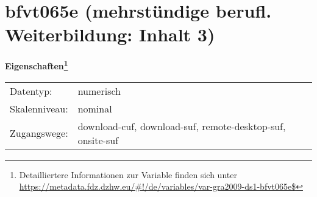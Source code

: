 
    \setcounter{footnote}{0}

    \vspace*{-1.8cm}
	\section{bfvt065e (mehrstündige berufl. Weiterbildung: Inhalt 3)}
	\label{section:bfvt065e}



    \vspace*{0.5cm}
    \noindent\textbf{Eigenschaften\footnote{Detailliertere Informationen zur Variable finden sich unter
		\url{https://metadata.fdz.dzhw.eu/\#!/de/variables/var-gra2009-ds1-bfvt065e$}}}\\
	\begin{tabularx}{\hsize}{@{}lX}
	Datentyp: & numerisch \\
	Skalenniveau: & nominal \\
	Zugangswege: &
	  download-cuf, 
	  download-suf, 
	  remote-desktop-suf, 
	  onsite-suf
 \\
    \end{tabularx}



